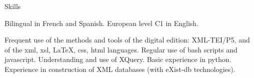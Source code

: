 











\begin{rubric}{Skills}
                    \entry*
                    
                Bilingual in French and Spanish. European level C1 in
                    English.
                    \entry*
                    
                Frequent use of the methods and tools of the digital
                    edition: XML-TEI/P5, and of the xml, xsl, \LaTeX, css, html
                    languages. Regular use of bash scripts and javascript.
                    Understanding and use of XQuery. Basic experience in python.
                    Experience in construction of XML databases (with eXist-db
                    technologies).\end{rubric}




